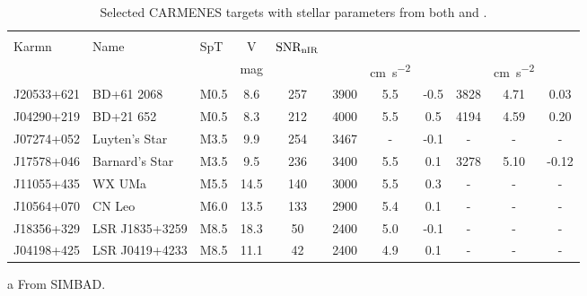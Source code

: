 
\begin{table}[h]
    \centering
    \begin{threeparttable}
        \caption[{CARMENES} targets for {RV} precision analysis.]{Selected {CARMENES} targets with stellar parameters from both \citet{rajpurohit_exploring_2018} and \citet{passegger_carmenes_2018}.}
        \begin{tabular}{lllcccccccc}
            \toprule
            & & & & & \multicolumn{3}{c}{\citet{rajpurohit_exploring_2018}} & \multicolumn{3}{c}{\citet{passegger_carmenes_2018}} \\
            Karmn & Name & SpT & V & \(\textrm{SNR}{}_{\textrm{nIR}{}}\) & \Teff{} & \Logg{} & \feh{} & \Teff{} & \Logg{} & \feh{} \\
            &  &  & mag &  & \K{} & \si{\centi\metre\per\second\squared} & & \K{} & \si{\centi\metre\per\second\squared} &  \\
            \midrule
            J20533+621 & BD+61 2068     & M0.5 & 8.6  & 257 & 3900          & 5.5 & -0.5           & 3828 & 4.71 & 0.03 \\
            J04290+219 & BD+21 652      & M0.5 & 8.3  & 212 & 4000          & 5.5 & 0.5            & 4194 & 4.59 & 0.20 \\
            J07274+052 & Luyten's Star  & M3.5 & 9.9  & 254 & 3467\tnote{a} & -   & -0.1\tnote{a}  & -    & -    & -    \\
            J17578+046 & Barnard's Star & M3.5 & 9.5  & 236 & 3400          & 5.5 & 0.1            & 3278 & 5.10 & -0.12 \\
            J11055+435 & WX UMa         & M5.5 & 14.5 & 140 & 3000          & 5.5 & 0.3 & - & - & - \\
            J10564+070 & CN Leo         & M6.0 & 13.5 & 133 & 2900          & 5.4 & 0.1 & - & - & - \\
            J18356+329 & LSR J1835+3259 & M8.5 & 18.3 & 50  & 2400          & 5.0 &-0.1 & - & - & - \\
            J04198+425 & LSR J0419+4233 & M8.5 & 11.1 & 42  & 2400          & 4.9 & 0.1 & - & - & - \\
        \bottomrule
        \end{tabular}\label{tab:carmenes_selection_updated}
        \begin{tablenotes}
            \item [a] {From SIMBAD.}
        \end{tablenotes}
    \end{threeparttable}
\end{table}
